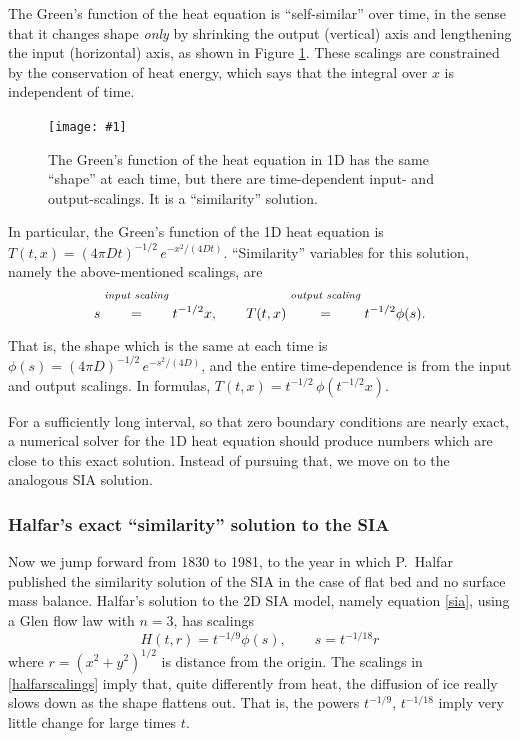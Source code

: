 \documentclass[titlepage,letterpaper,final,12pt]{scrartcl}
\newcommand{\onefigsize}[3]{
\begin{figure}[ht]
\centering
\texttt{[image: \#1]}
\caption{#2}
\label{fig:#1}
\end{figure}}
\begin{document}
The Green's function of the heat equation is ``self-similar'' over time, in the sense that it changes shape \emph{only} by shrinking the output (vertical) axis and lengthening the input (horizontal) axis, as shown in Figure \ref{fig:heatscaling}.  These scalings are constrained by the conservation of heat energy, which says that the integral over $x$ is independent of time.

\onefigsize{heatscaling}{The Green's function of the heat equation in 1D has the same ``shape'' at each time, but there are time-dependent input- and output-scalings.  It is a ``similarity'' solution.}{2.4in}

In particular, the Green's function of the 1D heat equation is $T(t,x) = (4 \pi D t)^{-1/2}\, e^{-x^2/(4Dt)}$.  ``Similarity'' variables for this solution, namely the above-mentioned scalings, are
	$$s \stackrel{\text{\emph{input scaling}}}{\phantom{\Big|}=\phantom{\Big|}} t^{-1/2} x, \qquad T(t,x) \stackrel{\text{\emph{output scaling}}}{\phantom{\Big|}=\phantom{\Big|}} t^{-1/2} \phi(s).$$
That is, the shape which is the same at each time is $\phi(s) = (4 \pi D)^{-1/2}\, e^{-s^2/(4D)}$, and the entire time-dependence is from the input and output scalings.  In formulas, $T(t,x) = t^{-1/2}\, \phi\left(t^{-1/2} x\right)$.

For a sufficiently long interval, so that zero boundary conditions are nearly exact, a numerical solver for the 1D heat equation should produce numbers which are close to this exact solution.  Instead of pursuing that, we move on to the analogous SIA solution.

\subsubsection*{Halfar's exact ``similarity'' solution to the SIA}  Now we jump forward from 1830 to 1981, to the year in which P.~Halfar published the similarity solution of the SIA in the case of flat bed and no surface mass balance.
Halfar's solution to the 2D SIA model, namely equation \eqref{sia}, using a Glen flow law with $n=3$, has scalings
\begin{equation}
H(t,r)=t^{-1/9} \phi(s), \qquad s = t^{-1/18} r \label{halfarscalings}
\end{equation}
where $r=(x^2+y^2)^{1/2}$ is distance from the origin.  The scalings in \eqref{halfarscalings} imply that, quite differently from heat, the diffusion of ice really slows down as the shape flattens out.  That is, the powers $t^{-1/9}$, $t^{-1/18}$ imply very little change for large times $t$.
\end{document}
